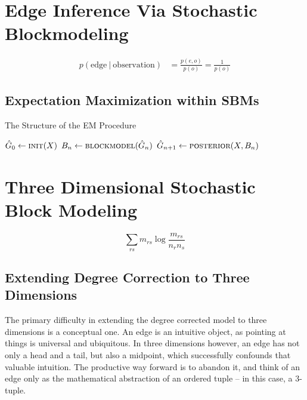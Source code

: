 \documentclass[11pt]{scrartcl}
\begin{document}
\section{Edge Inference Via Stochastic Blockmodeling}


\begin{align}
p( \text{edge} \:|\: \text{observation}) &= \frac{p(e, o)}{p(o)} = \frac{1}{p(o)}
\end{align}


\subsection{Expectation Maximization within SBMs}



\begin{algorithm}
\caption{The Structure of the EM Procedure}
\begin{algorithmic}
\State $\hat{G}_0 \gets \Call{init}{X}$
	\State $B_n \gets \Call{blockmodel}{\hat{G}_n}$ 
	\State $\hat{G}_{n+1} \gets \Call{posterior}{X, B_n}$ 
		\State {}
	\EndIf
\EndWhile
\State {}
\end{algorithmic}
\end{algorithm}


\section{Three Dimensional Stochastic Block Modeling}

\[
\sum_{rs} m_{rs} \log \frac{m_{rs}}{n_r n_s}
\]

\subsection{Extending Degree Correction to Three Dimensions}

The primary difficulty in extending the degree corrected model to three dimensions is a conceptual one. An edge is an intuitive object, as pointing at things is universal and ubiquitous. In three dimensions however, an edge has not only a head and a tail, but also a midpoint, which successfully confounds that valuable intuition. The productive way forward is to abandon it, and think of an edge only as the mathematical abstraction of an ordered tuple -- in this case, a 3-tuple. 
\end{document}
